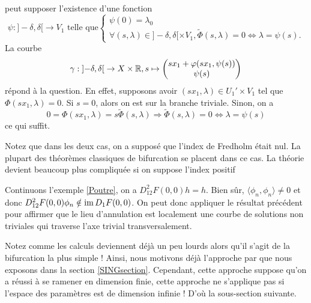 \documentclass[memoire.tex]{subfiles}
\begin{document}
\begin{preuve}
    peut supposer l'existence d'une fonction 
        \begin{equation*}
        \psi : ]-\delta,\delta [\rightarrow V_1\text{ telle que} 
        \begin{cases}
            \psi(0)=\lambda_0
            \\ \forall (s,\lambda)\in ]-\delta,\delta[\times V_1, \tilde{\Phi}(s,\lambda)=0\Leftrightarrow \lambda=\psi(s).
        \end{cases}
    \end{equation*}
La courbe
    \begin{equation*}
        \gamma : \left] -\delta,\delta\right[\rightarrow X\times \mathbb{R},s\mapsto
                    \begin{pmatrix}
                    sx_1+\varphi(sx_1,\psi(s))\\
                    \psi(s)
                    \end{pmatrix}
    \end{equation*}
répond à la question.  En effet, supposons avoir $(sx_1,\lambda)\in U_1'\times V_1$ tel que $\Phi(sx_1,\lambda)=0$. Si $s=0$, alors on est sur la branche triviale. Sinon, on a
\begin{equation*}
    0=\Phi(sx_1,\lambda)=s\tilde{\Phi}(s,\lambda)\Rightarrow \tilde{\Phi}(s,\lambda)=0\Leftrightarrow \lambda=\psi(s)
\end{equation*}
ce qui suffit.
\end{preuve}
\begin{remarque}\label{remarque INd=0}
    Notez que dans les deux cas, on a supposé que l'index de Fredholm était nul. La plupart des théorèmes classiques de bifurcation se placent dans ce cas. La théorie devient beaucoup plus compliquée si on suppose l'index positif 
\end{remarque}
\begin{exemple}
    Continuons l'exemple \ref{Poutre}, on a $D^2_{12}F(0,0)h=h$. Bien sûr, $\langle \phi_n,\phi_n\rangle \neq 0$ et donc $D^2_{12}F(0,0)\phi_n\notin \operatorname{im} D_1 F(0,0)$. On peut donc appliquer le résultat précédent pour affirmer que le lieu d'annulation est localement une courbe de solutions non triviales qui traverse l'axe trivial transversalement.
\end{exemple}
Notez comme les calculs deviennent déjà un peu lourds alors qu'il s'agit de la bifurcation la plus simple ! Ainsi, nous motivons déjà l'approche par  que nous exposons dans la section \ref{SINGsection}. Cependant, cette approche suppose qu'on a réussi à se ramener en dimension finie, cette approche ne s'applique pas si l'espace des paramètres est de dimension infinie ! D'où la sous-section suivante.
\end{document}
